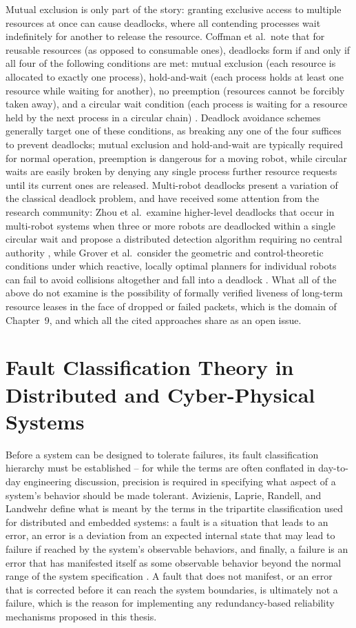 Mutual exclusion is only part of the story: granting exclusive access to multiple resources at once can cause deadlocks, where all contending processes wait indefinitely for another to release the resource. Coffman et al.\ note that for reusable resources (as opposed to consumable ones), deadlocks form if and only if all four of the following conditions are met: mutual exclusion (each resource is allocated to exactly one process), hold-and-wait (each process holds at least one resource while waiting for another), no preemption (resources cannot be forcibly taken away), and a circular wait condition (each process is waiting for a resource held by the next process in a circular chain) \cite{coffman1971system}. Deadlock avoidance schemes generally target one of these conditions, as breaking any one of the four suffices to prevent deadlocks; mutual exclusion and hold-and-wait are typically required for normal operation, preemption is dangerous for a moving robot, while circular waits are easily broken by denying any single process further resource requests until its current ones are released. Multi-robot deadlocks present a variation of the classical deadlock problem, and have received some attention from the research community: Zhou et al.\ examine higher-level deadlocks that occur in multi-robot systems when three or more robots are deadlocked within a single circular wait and propose a distributed detection algorithm requiring no central authority \cite{zhou2020distributed}, while Grover et al.\ consider the geometric and control-theoretic conditions under which reactive, locally optimal planners for individual robots can fail to avoid collisions altogether and fall into a deadlock \cite{grover2023deadlock}. What all of the above do not examine is the possibility of formally verified liveness of long-term resource leases in the face of dropped or failed packets, which is the domain of Chapter~9, and which all the cited approaches share as an open issue.

\section{Fault Classification Theory in Distributed and Cyber-Physical Systems}

Before a system can be designed to tolerate failures, its fault classification hierarchy must be established -- for while the terms are often conflated in day-to-day engineering discussion, precision is required in specifying what aspect of a system's behavior should be made tolerant. Avizienis, Laprie, Randell, and Landwehr define what is meant by the terms in the tripartite classification used for distributed and embedded systems: a fault is a situation that leads to an error, an error is a deviation from an expected internal state that may lead to failure if reached by the system's observable behaviors, and finally, a failure is an error that has manifested itself as some observable behavior beyond the normal range of the system specification \cite{avizienis2004basic}. A fault that does not manifest, or an error that is corrected before it can reach the system boundaries, is ultimately not a failure, which is the reason for implementing any redundancy-based reliability mechanisms proposed in this thesis.

